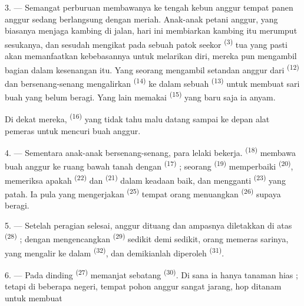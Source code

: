 3. --- Semangat perburuan membawanya ke tengah kebun anggur tempat
panen anggur sedang berlangsung dengan meriah. Anak-anak petani
anggur, yang biasanya menjaga kambing di jalan, hari ini membiarkan
kambing itu merumput sesukanya, dan sesudah mengikat pada sebuah
patok seekor  \textsuperscript{(3)} tua yang
pasti akan memanfaatkan kebebasannya untuk melarikan diri, mereka pun
mengambil bagian dalam kesenangan itu. Yang seorang mengambil setandan
anggur dari  \textsuperscript{(12)} dan
bersenang-senang mengalirkan  \textsuperscript{(14)} ke
dalam sebuah  \textsuperscript{(13)} untuk membuat sari
buah yang belum beragi. Yang lain memakai 
\textsuperscript{(15)} yang baru saja ia anyam.

Di dekat mereka,  \textsuperscript{(16)}
yang tidak tahu malu datang sampai ke depan alat pemeras untuk mencuri
buah anggur.

4. --- Sementara anak-anak bersenang-senang, para lelaki bekerja.
 \textsuperscript{(18)} membawa buah anggur
ke ruang bawah tanah dengan 
\textsuperscript{(17)} ; seorang 
\textsuperscript{(19)} memperbaiki 
\textsuperscript{(20)}, memeriksa apakah 
\textsuperscript{(22)} dan 
\textsuperscript{(21)} dalam keadaan baik, dan mengganti  \textsuperscript{(23)} yang patah. Ia pula yang mengerjakan
 \textsuperscript{(25)} tempat orang menuangkan
 \textsuperscript{(26)} supaya beragi.

5. --- Setelah peragian selesai, anggur dituang dan ampasnya
diletakkan di atas  \textsuperscript{(28)} ;
dengan mengencangkan  \textsuperscript{(29)}
sedikit demi sedikit, orang memeras sarinya, yang mengalir ke dalam
 \textsuperscript{(32)}, dan demikianlah diperoleh
 \textsuperscript{(31)}.

\VUsaut{6.0mm}
\VUsaut{3.4mm}

6. --- Pada dinding  \textsuperscript{(27)}
memanjat sebatang  \textsuperscript{(30)}. Di sana ia hanya
tanaman hias ; tetapi di beberapa negeri, tempat pohon anggur sangat
jarang, hop ditanam untuk membuat 

